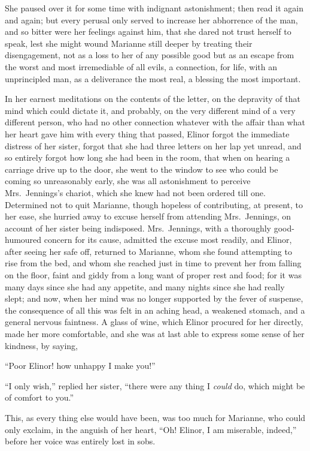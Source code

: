 \documentclass{article}
\begin{document}
She paused over it for some time with indignant
astonishment; then read it again and again; but every
perusal only served to increase her abhorrence of the man,
and so bitter were her feelings against him, that she
dared not trust herself to speak, lest she might wound
Marianne still deeper by treating their disengagement,
not as a loss to her of any possible good but as an
escape from the worst and most irremediable of all
evils, a connection, for life, with an unprincipled man,
as a deliverance the most real, a blessing the most important.

In her earnest meditations on the contents of the letter,
on the depravity of that mind which could dictate it,
and probably, on the very different mind of a very different
person, who had no other connection whatever with the affair
than what her heart gave him with every thing that passed,
Elinor forgot the immediate distress of her sister,
forgot that she had three letters on her lap yet unread,
and so entirely forgot how long she had been in the room,
that when on hearing a carriage drive up to the door,
she went to the window to see who could be coming so
unreasonably early, she was all astonishment to perceive
Mrs.\ Jennings's chariot, which she knew had not been
ordered till one.  Determined not to quit Marianne,
though hopeless of contributing, at present, to her ease,
she hurried away to excuse herself from attending
Mrs.\ Jennings, on account of her sister being indisposed.
Mrs.\ Jennings, with a thoroughly good-humoured concern
for its cause, admitted the excuse most readily, and Elinor,
after seeing her safe off, returned to Marianne, whom she
found attempting to rise from the bed, and whom she reached
just in time to prevent her from falling on the floor,
faint and giddy from a long want of proper rest and food;
for it was many days since she had any appetite, and many
nights since she had really slept; and now, when her
mind was no longer supported by the fever of suspense,
the consequence of all this was felt in an aching head,
a weakened stomach, and a general nervous faintness.
A glass of wine, which Elinor procured for her directly,
made her more comfortable, and she was at last able to express
some sense of her kindness, by saying,

``Poor Elinor! how unhappy I make you!''

``I only wish,'' replied her sister, ``there were
any thing I \emph{could} do, which might be of comfort to you.''

This, as every thing else would have been,
was too much for Marianne, who could only exclaim,
in the anguish of her heart, ``Oh! Elinor, I am miserable,
indeed,'' before her voice was entirely lost in sobs.
\end{document}
